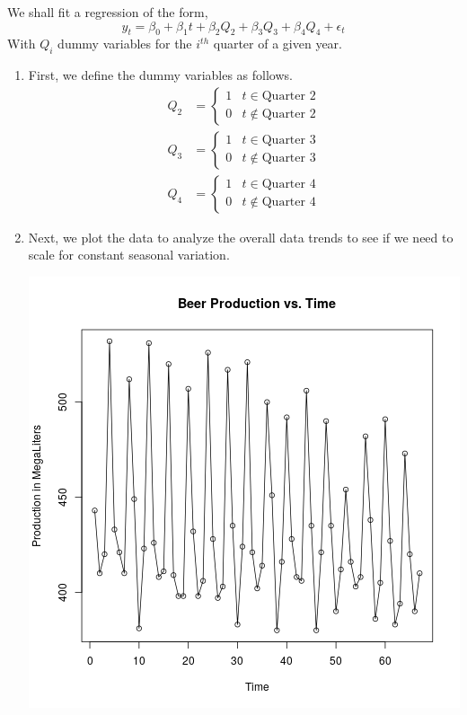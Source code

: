 \documentclass[letterpaper,10pt]{article}
\begin{document}
We shall fit a regression of the form,
\[y_t=\beta_0+\beta_1 t+\beta_2 Q_2+\beta_3 Q_3+\beta_4 Q_4+\epsilon_t\]
With $Q_i$ dummy variables for the $i^{th}$ quarter of a given year.
\begin{enumerate}
\item First, we define the dummy variables as follows.
\begin{align*}
Q_2 &= \begin{cases}
1 & t\in\text{Quarter 2}\\
0 & t\not\in\text{Quarter 2}
\end{cases}\\
Q_3 &= \begin{cases}
1 & t\in\text{Quarter 3}\\
0 & t\not\in\text{Quarter 3}
\end{cases}\\
Q_4 &= \begin{cases}
1 & t\in\text{Quarter 4}\\
0 & t\not\in\text{Quarter 4}
\end{cases}
\end{align*}
\item Next, we plot the data to analyze the overall data trends to see if we need to scale for constant seasonal variation.
\begin{center}
\includegraphics[scale=.8]{unlogged.png}
\end{center}

\end{enumerate}
\end{document}
